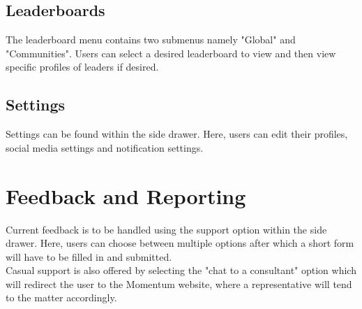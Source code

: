 \documentclass[11pt]{article}
\begin{document}
\subsection{Leaderboards}
The leaderboard menu contains two submenus namely "Global" and "Communities". Users can select a desired
leaderboard to view and then view specific profiles of leaders if desired.\\
\subsection{Settings}
Settings can be found within the side drawer. Here, users can edit their profiles, social media settings and
notification settings.\\

\newpage
\section{Feedback and Reporting}
Current feedback is to be handled using the support option within the side drawer. Here, users can choose between
multiple options after which a short form will have to be filled in and submitted.\\
Casual support is also offered by selecting the "chat to a consultant" option which will redirect the user to the
Momentum website, where a representative will tend to the matter accordingly.
\end{document}
